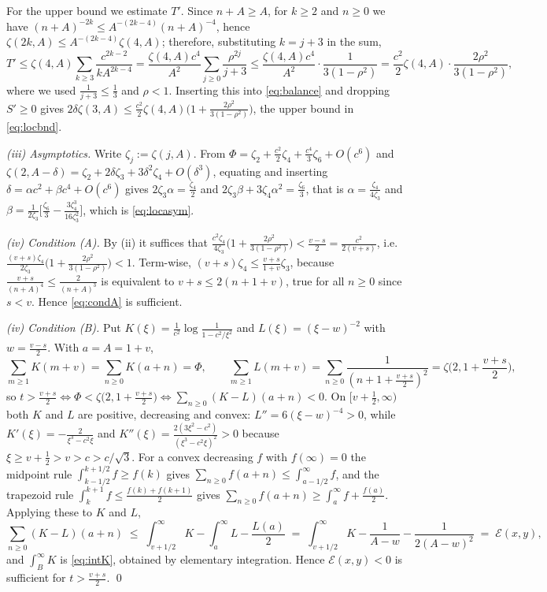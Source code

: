 For the upper bound we estimate $T'$. Since $n+A\ge A$, for $k\ge2$ and $n\ge0$ we have
$(n+A)^{-2k}\le A^{-(2k-4)}(n+A)^{-4}$, hence $\zeta(2k,A)\le A^{-(2k-4)}\zeta(4,A)$;
therefore, substituting $k=j+3$ in the sum,
\[
  T'\le\zeta(4,A)\sum_{k\ge3}\frac{c^{2k-2}}{kA^{2k-4}}
   =\frac{\zeta(4,A)c^{4}}{A^{2}}\sum_{j\ge0}\frac{\rho^{2j}}{j+3}
   \le\frac{\zeta(4,A)c^{4}}{A^{2}}\cdot\frac{1}{3(1-\rho^{2})}
   =\frac{c^{2}}{2}\zeta(4,A)\cdot\frac{2\rho^{2}}{3(1-\rho^{2})},
\]
where we used $\frac{1}{j+3}\le\frac13$ and $\rho<1$. Inserting this into
\eqref{eq:balance} and dropping $S'\ge0$ gives
$2\delta\zeta(3,A)\le\frac{c^{2}}{2}\zeta(4,A)\big(1+\frac{2\rho^{2}}{3(1-\rho^{2})}\big)$,
the upper bound in \eqref{eq:locbnd}.

\emph{(iii) Asymptotics.} Write $\zeta_{j}:=\zeta(j,A)$. From
$\Phi=\zeta_{2}+\frac{c^{2}}{2}\zeta_{4}+\frac{c^{4}}{3}\zeta_{6}+O(c^{6})$ and
$\zeta(2,A-\delta)=\zeta_{2}+2\delta\zeta_{3}+3\delta^{2}\zeta_{4}+O(\delta^{3})$,
equating and inserting $\delta=\alpha c^{2}+\beta c^{4}+O(c^{6})$ gives
$2\zeta_{3}\alpha=\frac{\zeta_{4}}{2}$ and
$2\zeta_{3}\beta+3\zeta_{4}\alpha^{2}=\frac{\zeta_{6}}{3}$, that is
$\alpha=\frac{\zeta_{4}}{4\zeta_{3}}$ and
$\beta=\frac{1}{2\zeta_{3}}\big[\frac{\zeta_{6}}{3}
-\frac{3\zeta_{4}^{3}}{16\zeta_{3}^{2}}\big]$, which is \eqref{eq:locasym}.

\emph{(iv) Condition (A).} By (ii) it suffices that
$\frac{c^{2}\zeta_{4}}{4\zeta_{3}}\big(1+\frac{2\rho^{2}}{3(1-\rho^{2})}\big)
<\frac{v-s}{2}=\frac{c^{2}}{2(v+s)}$, i.e.
$\frac{(v+s)\zeta_{4}}{2\zeta_{3}}\big(1+\frac{2\rho^{2}}{3(1-\rho^{2})}\big)<1$.
Term-wise, $(v+s)\zeta_{4}\le\frac{v+s}{1+v}\zeta_{3}$, because
$\frac{v+s}{(n+A)^{4}}\le\frac{2}{(n+A)^{3}}$ is equivalent to $v+s\le2(n+1+v)$, true for
all $n\ge0$ since $s<v$. Hence \eqref{eq:condA} is sufficient.

\emph{(iv) Condition (B).} Put $K(\xi)=\frac{1}{c^{2}}\log\frac{1}{1-c^{2}/\xi^{2}}$ and
$L(\xi)=(\xi-w)^{-2}$ with $w=\frac{v-s}{2}$. With $a=A=1+v$,
\[
  \sum_{m\ge1}K(m+v)=\sum_{n\ge0}K(a+n)=\Phi,\qquad
  \sum_{m\ge1}L(m+v)=\sum_{n\ge0}\frac{1}{(n+1+\frac{v+s}{2})^{2}}
   =\zeta\Big(2,1+\frac{v+s}{2}\Big),
\]
so $t>\frac{v+s}{2}\iff\Phi<\zeta\big(2,1+\frac{v+s}{2}\big)
\iff\sum_{n\ge0}(K-L)(a+n)<0$. On $[v+\frac12,\infty)$ both $K$ and $L$ are positive,
decreasing and convex: $L''=6(\xi-w)^{-4}>0$, while
$K'(\xi)=-\frac{2}{\xi^{3}-c^{2}\xi}$ and
$K''(\xi)=\frac{2(3\xi^{2}-c^{2})}{(\xi^{3}-c^{2}\xi)^{2}}>0$ because
$\xi\ge v+\frac12>v>c>c/\sqrt3$. For a convex decreasing $f$ with $f(\infty)=0$ the
midpoint rule $\int_{k-1/2}^{k+1/2}f\ge f(k)$ gives
$\sum_{n\ge0}f(a+n)\le\int_{a-1/2}^{\infty}f$, and the trapezoid rule
$\int_{k}^{k+1}f\le\frac{f(k)+f(k+1)}{2}$ gives
$\sum_{n\ge0}f(a+n)\ge\int_{a}^{\infty}f+\frac{f(a)}{2}$. Applying these to $K$ and $L$,
\[
  \sum_{n\ge0}(K-L)(a+n)\;\le\;\int_{v+1/2}^{\infty}K
   -\int_{a}^{\infty}L-\frac{L(a)}{2}
   \;=\;\int_{v+1/2}^{\infty}K-\frac{1}{A-w}-\frac{1}{2(A-w)^{2}}
   \;=\;\mathcal{E}(x,y),
\]
and $\int_{B}^{\infty}K$ is \eqref{eq:intK}, obtained by elementary integration. Hence
$\mathcal{E}(x,y)<0$ is sufficient for $t>\frac{v+s}{2}$. \qed

